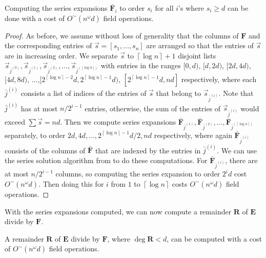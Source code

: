 \begin{lem}
Computing the series expansions $\bar{\mathbf{F}}_{i}$ to order $s_{i}$
for all $i$'s where $s_{i}\ge d$ can be done with a cost of \textup{$O^{\sim}\left(n^{\omega}d\right)$
field operations.}\end{lem}
\begin{proof}
As before, we assume without loss of generality that the columns of
$\mathbf{F}$ and the corresponding entries of $\vec{s}=\left[s_{1},\dots,s_{n}\right]$
are arranged so that the entries of $\vec{s}$ are in increasing order.
We separate $\vec{s}$ to $\left\lceil \log n\right\rceil +1$ disjoint
lists  $\vec{s}_{\bar{j}^{\left(0\right)}},\vec{s}_{\bar{j}^{\left(1\right)}},\vec{s}_{\bar{j}^{\left(2\right)}},\dots,\vec{s}_{\bar{j}^{\left(\left\lceil \log n\right\rceil \right)}}$
with entries in the ranges $[0,d)$, $[d,2d)$, $[2d,4d)$, $[4d,8d)$,
...,$[2^{\left\lceil \log n\right\rceil -2}d,2^{\left\lceil \log n\right\rceil -1}d)$,
$[2^{\left\lceil \log n\right\rceil -1}d,nd]$ respectively, where
each $\bar{j}^{(i)}$ consists a list of indices of the entries of
$\vec{s}$ that belong to $\vec{s}_{\bar{j}^{\left(i\right)}}$. Note
that $\bar{j}^{\left(i\right)}$ has at most $n/2^{i-1}$ entries,
otherwise, the sum of the entries of $\vec{s}_{\bar{j}^{(i)}}$ would
exceed $\sum\vec{s}=nd$. Then we compute series expansions $\bar{\mathbf{F}}_{\bar{j}^{\left(1\right)}},\bar{\mathbf{F}}_{\bar{j}^{\left(2\right)}},\dots,\bar{\mathbf{F}}_{\bar{j}^{\left(\left\lceil \log n\right\rceil \right)}}$
separately, to order $2d,4d,\dots,2^{\left\lceil \log n\right\rceil -1}d/2,nd$
respectively, where again $\bar{\mathbf{F}}_{\bar{j}^{(i)}}$ consists
of the columns of $\bar{\mathbf{F}}$ that are indexed by the entries
in $\bar{j}^{\left(i\right)}$. We can use the series solution algorithm
from \citet{storjohann:2003} to do these computations. For $\bar{\mathbf{F}}{}_{\bar{j}^{\left(i\right)}}$,
there are at most $n/2^{i-1}$ columns, so computing the series expansion
to order $2^{i}d$ cost $O^{\sim}\left(n^{\omega}d\right)$. Then
doing this for $i$ from $1$ to $\left\lceil \log n\right\rceil $
costs $O^{\sim}\left(n^{\omega}d\right)$ field operations. 
\end{proof}
With the series expansions computed, we can now compute a remainder
$\mathbf{R}$ of $\mathbf{E}$ divide by $\mathbf{F}$.
\begin{lem}
A remainder $\mathbf{R}$ of $\mathbf{E}$ divide by $\mathbf{F}$,
where $\deg\mathbf{R}<d$, can be computed with a cost of $O^{\sim}\left(n^{\omega}d\right)$
field operations.\end{lem}
